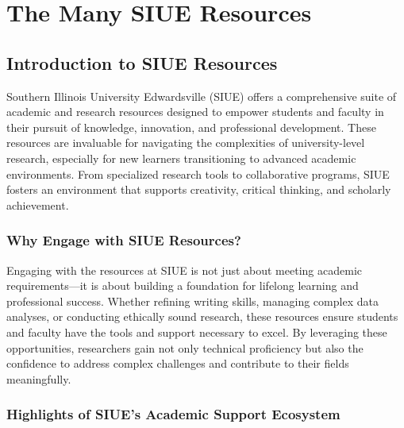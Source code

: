 \documentclass[
]{book}
\begin{document}
\chapter{The Many SIUE Resources}\label{the-many-siue-resources}

\section{Introduction to SIUE Resources}\label{introduction-to-siue-resources}

Southern Illinois University Edwardsville (SIUE) offers a comprehensive suite of academic and research resources designed to empower students and faculty in their pursuit of knowledge, innovation, and professional development. These resources are invaluable for navigating the complexities of university-level research, especially for new learners transitioning to advanced academic environments. From specialized research tools to collaborative programs, SIUE fosters an environment that supports creativity, critical thinking, and scholarly achievement.

\subsection*{Why Engage with SIUE Resources?}\label{why-engage-with-siue-resources}

Engaging with the resources at SIUE is not just about meeting academic requirements---it is about building a foundation for lifelong learning and professional success. Whether refining writing skills, managing complex data analyses, or conducting ethically sound research, these resources ensure students and faculty have the tools and support necessary to excel. By leveraging these opportunities, researchers gain not only technical proficiency but also the confidence to address complex challenges and contribute to their fields meaningfully.

\subsection*{Highlights of SIUE's Academic Support Ecosystem}\label{highlights-of-siues-academic-support-ecosystem}
\end{document}
